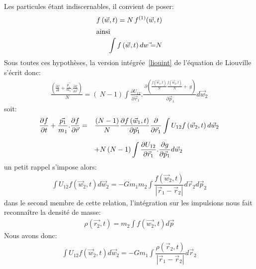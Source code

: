 Les particules étant indiscernables, il convient de poser:
\begin{align*}
	f\left(  \vec{w},t\right)  =N\,f^{(1)}(\vec{w},t) \\
	\intertext{ainsi}
	\int f\left(  \vec{w},t\right)  d\vec{w=}N
\end{align*}
Sous toutes ces hypothèses, la version intégrée~\ref{liouint} de l'équation de Liouville s'écrit donc:
\begin{align*}
	\frac{\left(  \frac{\partial f}{\partial t}+\frac{\vec{p_{1}}}{m_{1}}.\frac{\partial f}{\partial\vec{r}}\right)  }{{\ N}}=\left(  {\ N-1}%
	\right)  \displaystyle\int\tfrac{\partial U_{12}}{\partial\vec{r}_{1}}.\frac{{\ \partial}\left(  \frac{f\left(  \vec{w}_{1},t\right)  }{N}%
	\frac{f\left(  \vec{w}_{2},t\right)  }{N}+{\ g}\right)  }{{\ \partial}\vec{p}_{1}}d\vec{w}_{2}%
\end{align*}
soit:
\begin{align*}%
	\begin{array}[c]{ll}%
		\dfrac{\partial f}{\partial t}+\dfrac{\vec{p_{1}}}{m_{1}}.\dfrac{\partial f}{\partial\vec{r}}= & \dfrac{\left(  N-1\right)  }{N}\dfrac{\partial
		f\left(  \vec{w}_{1},t\right)  }{\partial\vec{p}_{1}}\dfrac{\partial}{\partial\vec{r}_{1}}\displaystyle\int U_{12}f\left(  \vec{w}%
		_{2},t\right)  d\vec{w}_{2}\\
		& \\
		& +N\left(  N-1\right)  \displaystyle\int\dfrac{\partial U_{12}}{\partial\vec{r}_{1}}.\dfrac{\partial g}{\partial\vec{p}_{1}}%
		d\vec{w}_{2}%
	\end{array}
\end{align*}
un petit rappel s'impose alors:
\begin{align*}
	\displaystyle\int U_{12}f\left(  \vec{w}_{2},t\right)  d\vec{w}_{2}=-Gm_{1}m_{2}\displaystyle\int\dfrac{f\left(  \vec{w}_{2},t\right)
	}{\left\vert \vec{r}_{1}-\vec{r}_{2}\right\vert }d\vec{r}_{2}d\vec{p}_{2}%
\end{align*}
dans le second membre de cette relation, l'intégration sur les impulsions nous fait reconnaître la densité de masse:
\begin{align*}
	\rho\left(  \vec{r_{2}},t\right)  =m_{2}\displaystyle\int f\left(\vec{w_{2}},t\right)  d\vec{p}%
\end{align*}
Nous avons donc:
\begin{align*}
	\displaystyle\int U_{12}f\left(  \vec{w}_{2},t\right)  d\vec{w}_{2}=-Gm_{1}\displaystyle\int\dfrac{\rho\left(  \vec{r}_{2},t\right)
	}{\left\vert \vec{r}_{1}-\vec{r}_{2}\right\vert }d\vec{r}_{2}%
\end{align*}
